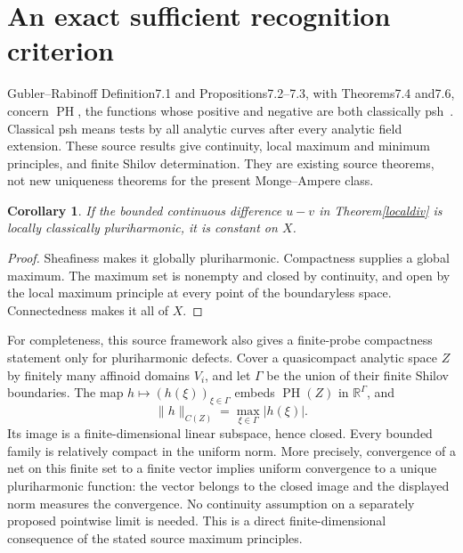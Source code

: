 \documentclass[11pt]{article}
\newtheorem{corollary}[theorem]{Corollary}
\newcommand{\PH}{\operatorname{PH}}
\begin{document}
\section{An exact sufficient recognition criterion}
Gubler--Rabinoff Definition7.1 and Propositions7.2--7.3, with
Theorems7.4 and7.6, concern $\PH$, the functions whose positive and
negative are both classically psh~\cite{GR}. Classical psh means tests
by all analytic curves after every analytic field extension. These
source results give continuity, local maximum and minimum principles,
and finite Shilov determination. They are existing source theorems,
not new uniqueness theorems for the present Monge--Ampere class.

\begin{corollary}\label{criterion}
If the bounded continuous difference $u-v$ in
Theorem\ref{localdiv} is locally classically pluriharmonic, it is
constant on $X$.
\end{corollary}
\begin{proof}
Sheafiness makes it globally pluriharmonic. Compactness supplies a
global maximum. The maximum set is nonempty and closed by continuity,
and open by the local maximum principle at every point of the
boundaryless space. Connectedness makes it all of $X$.
\end{proof}

For completeness, this source framework also gives a finite-probe
compactness statement only for pluriharmonic defects. Cover a
quasicompact analytic space $Z$ by finitely many affinoid domains
$V_i$, and let $\Gamma$ be the union of their finite Shilov boundaries.
The map $h\mapsto(h(\xi))_{\xi\in\Gamma}$ embeds $\PH(Z)$ in
$\mathbb R^\Gamma$, and
\[
 \|h\|_{C(Z)}=\max_{\xi\in\Gamma}|h(\xi)|.
\]
Its image is a finite-dimensional linear subspace, hence closed.
Every bounded family is relatively compact in the uniform norm.
More precisely, convergence of a net on this finite set to a finite
vector implies uniform convergence to a unique pluriharmonic function:
the vector belongs to the closed image and the displayed norm measures
the convergence. No continuity assumption on a separately proposed
pointwise limit is needed. This is a direct finite-dimensional
consequence of the stated source maximum principles.
\end{document}
